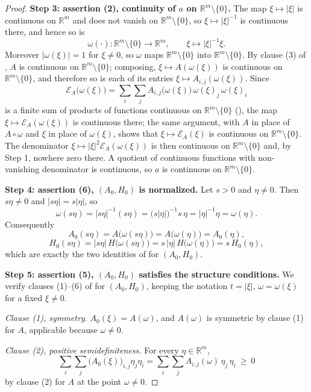 \begin{proof}
\medskip\noindent\textbf{Step 3: assertion (2), continuity of $a$ on
$\mathbb R^{m}\setminus\{0\}$.} The map $\xi\mapsto|\xi|$ is continuous on $\mathbb R^{m}$
and does not vanish on $\mathbb R^{m}\setminus\{0\}$, so $\xi\mapsto|\xi|^{-1}$ is
continuous there, and hence so is
\[
 \omega(\cdot):\mathbb R^{m}\setminus\{0\}\to\mathbb R^{m},\qquad \xi\mapsto|\xi|^{-1}\xi .
\]
Moreover $|\omega(\xi)|=1$ for $\xi\ne0$, so $\omega$ maps
$\mathbb R^{m}\setminus\{0\}$ into $\mathbb R^{m}\setminus\{0\}$. By clause (3) of
, $A$ is continuous on $\mathbb R^{m}\setminus\{0\}$;
composing, $\xi\mapsto A(\omega(\xi))$ is continuous on $\mathbb R^{m}\setminus\{0\}$, and
therefore so is each of its entries $\xi\mapsto A_{i,j}(\omega(\xi))$. Since
\[
 \mathcal E_A\big(\omega(\xi)\big)
  =\sum_{i}\sum_{j}A_{i,j}\big(\omega(\xi)\big)\,\omega(\xi)_j\,\omega(\xi)_i
\]
is a finite sum of products of functions continuous on $\mathbb R^{m}\setminus\{0\}$
(), the map $\xi\mapsto\mathcal E_A(\omega(\xi))$ is continuous there; the
same argument, with $A$ in place of $A\circ\omega$ and $\xi$ in place of $\omega(\xi)$,
shows that $\xi\mapsto\mathcal E_A(\xi)$ is continuous on $\mathbb R^{m}\setminus\{0\}$.
The denominator $\xi\mapsto|\xi|^{2}\mathcal E_A(\omega(\xi))$ is then continuous on
$\mathbb R^{m}\setminus\{0\}$ and, by Step 1, nowhere zero there. A quotient of continuous
functions with non-vanishing denominator is continuous, so $a$ is continuous on
$\mathbb R^{m}\setminus\{0\}$.

\medskip\noindent\textbf{Step 4: assertion (6), $(A_0,H_0)$ is normalized.} Let $s>0$ and
$\eta\ne0$. Then $s\eta\ne0$ and $|s\eta|=s|\eta|$, so
\[
 \omega(s\eta)=|s\eta|^{-1}(s\eta)=\big(s|\eta|\big)^{-1}s\,\eta=|\eta|^{-1}\eta=\omega(\eta).
\]
Consequently
\[
 A_0(s\eta)=A\big(\omega(s\eta)\big)=A\big(\omega(\eta)\big)=A_0(\eta),
\]
\[
 H_0(s\eta)=|s\eta|\,H\big(\omega(s\eta)\big)=s\,|\eta|\,H\big(\omega(\eta)\big)=s\,H_0(\eta),
\]
which are exactly the two identities of  for $(A_0,H_0)$.

\medskip\noindent\textbf{Step 5: assertion (5), $(A_0,H_0)$ satisfies the structure
conditions.} We verify clauses (1)--(6) of  for
$(A_0,H_0)$, keeping the notation $t=|\xi|$, $\omega=\omega(\xi)$ for a fixed $\xi\ne0$.

\emph{Clause (1), symmetry.} $A_0(\xi)=A(\omega)$, and $A(\omega)$ is symmetric by clause (1)
for $A$, applicable because $\omega\ne0$.

\emph{Clause (2), positive semidefiniteness.} For every $\eta\in\mathbb R^{m}$,
\[
 \sum_{i}\sum_{j}\big(A_0(\xi)\big)_{i,j}\eta_j\eta_i
  =\sum_{i}\sum_{j}A_{i,j}(\omega)\,\eta_j\,\eta_i\ \ge\ 0
\]
by clause (2) for $A$ at the point $\omega\ne0$.


\end{proof}
